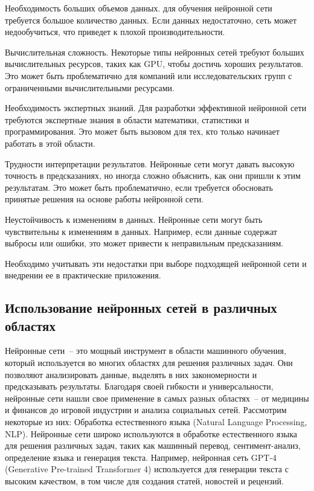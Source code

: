 \begin{enumerate_num}
    \item Необходимость больших объемов данных. для обучения нейронной сети требуется большое количество данных. Если данных недостаточно, сеть может недообучиться, что приведет к плохой производительности.
    \item Вычислительная сложность. Некоторые типы нейронных сетей требуют больших вычислительных ресурсов, таких как GPU, чтобы достичь хороших результатов. Это может быть проблематично для компаний или исследовательских групп с ограниченными вычислительными ресурсами.
    \item Необходимость экспертных знаний. Для разработки эффективной нейронной сети требуются экспертные знания в области математики, статистики и программирования. Это может быть вызовом для тех, кто только начинает работать в этой области.
    \item Трудности интерпретации результатов. Нейронные сети могут давать высокую точность в предсказаниях, но иногда сложно объяснить, как они пришли к этим результатам. Это может быть проблематично, если требуется обосновать принятые решения на основе работы нейронной сети.
    \item Неустойчивость к изменениям в данных. Нейронные сети могут быть чувствительны к изменениям в данных. Например, если данные содержат выбросы или ошибки, это может привести к неправильным предсказаниям.
\end{enumerate_num}

Необходимо учитывать эти недостатки при выборе подходящей нейронной сети и внедрении ее в практические приложения.

\subsection{Использование нейронных сетей в различных областях}

Нейронные сети~-- это мощный инструмент в области машинного обучения, который используется во многих областях для решения различных задач. Они позволяют анализировать данные, выделять в них закономерности и предсказывать результаты. Благодаря своей гибкости и универсальности, нейронные сети нашли свое применение в самых разных областях~-- от медицины и финансов до игровой индустрии и анализа социальных сетей. Рассмотрим некоторые из них:
Обработка естественного языка (Natural Language Processing, NLP). Нейронные сети широко используются в обработке естественного языка для решения различных задач, таких как машинный перевод, сентимент-анализ, определение языка и генерация текста. Например, нейронная сеть GPT-4 (Generative Pre-trained Transformer 4) используется для генерации текста с высоким качеством, в том числе для создания статей, новостей и рецензий.

